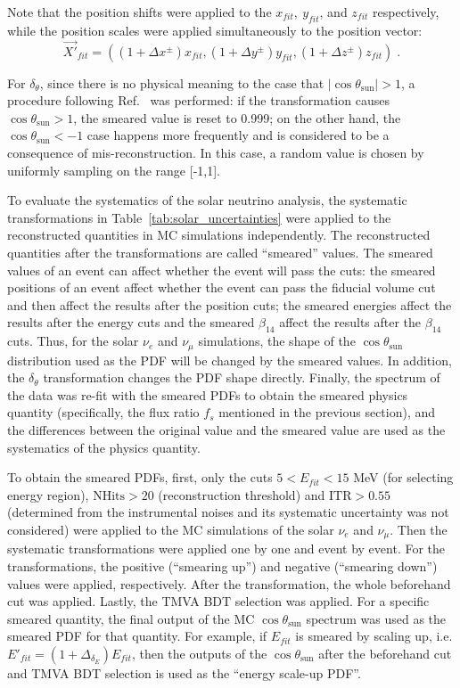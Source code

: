 {Note that the position shifts were applied to the $x_{fit},~y_{fit}$, and $z_{fit}$ respectively, while the position scales were applied simultaneously to the position vector: 
\begin{equation*}
\vec{X'}_{fit}=((1+ \Delta x^\pm)x_{fit},(1+ \Delta y^\pm)y_{fit},(1+ \Delta z^\pm)z_{fit})\; .
\end{equation*}

For $\delta_\theta$, since there is no physical meaning to the case that $\vert \cos\theta_\mathrm{sun} \vert >1$, a procedure following Ref.~\cite{waterunidoc} was performed: if the transformation causes $\cos\theta_\mathrm{sun}>1$, the smeared value is reset to 0.999; on the other hand, the $\cos\theta_\mathrm{sun}<-1$ case happens more frequently and is considered to be a consequence of mis-reconstruction. In this case, a random value is chosen by uniformly sampling on the range [-1,1].

To evaluate the systematics of the solar neutrino analysis, the systematic transformations in Table~\ref{tab:solar_uncertainties} were applied to the reconstructed quantities in MC simulations independently. The reconstructed quantities after the transformations are called ``smeared'' values. The smeared values of an event can affect whether the event will pass the cuts: the smeared positions of an event affect whether the event can pass the fiducial volume cut and then affect the results after the position cuts; the smeared energies affect the results after the energy cuts and the smeared $\beta_{14}$ affect the results after the $\beta_{14}$ cuts. Thus, for the solar $\nu_e$ and $\nu_\mu$ simulations, the shape of the $\cos\theta_\mathrm{sun}$ distribution used as the PDF will be changed by the smeared values. In addition, the $\delta_\theta$ transformation changes the PDF shape directly. Finally, the spectrum of the data was re-fit with the smeared PDFs to obtain the smeared physics quantity (specifically, the flux ratio $f_s$ mentioned in the previous section), and the differences between the original value and the smeared value are used as the systematics of the physics quantity.

To obtain the smeared PDFs, first, only the cuts $5<E_{fit}<15$ MeV (for selecting energy region), $\mathrm{NHits}>20$ (reconstruction threshold) and $\mathrm{ITR}>0.55$ (determined from the instrumental noises and its systematic uncertainty was not considered) were applied to the MC simulations of the solar $\nu_e$ and $\nu_\mu$. Then the systematic transformations were applied one by one and event by event. For the transformations, the positive (``smearing up'') and negative (``smearing down'') values were applied, respectively. After the transformation, the whole beforehand cut was applied. Lastly, the TMVA BDT selection was applied. For a specific smeared quantity, the final output of the MC $\cos\theta_\mathrm{sun}$ spectrum was used as the smeared PDF for that quantity. For example, if $E_{fit}$ is smeared by scaling up, i.e. $E'_{fit}=(1+\Delta_{\delta_E})E_{fit}$, then the outputs of the $\cos\theta_\mathrm{sun}$ after the beforehand cut and TMVA BDT selection is used as the ``energy scale-up PDF''.

}
